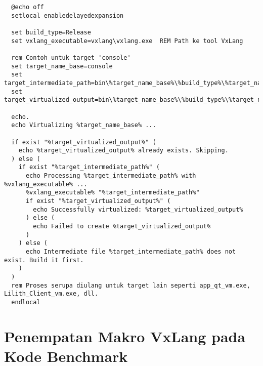\begin{verbatim}
  @echo off
  setlocal enabledelayedexpansion

  set build_type=Release
  set vxlang_executable=vxlang\vxlang.exe  REM Path ke tool VxLang

  rem Contoh untuk target 'console'
  set target_name_base=console
  set target_intermediate_path=bin\%target_name_base%\%build_type%\%target_name_base%_vm.exe
  set target_virtualized_output=bin\%target_name_base%\%build_type%\%target_name_base%_vm.vxm.exe

  echo.
  echo Virtualizing %target_name_base% ...

  if exist "%target_virtualized_output%" (
    echo %target_virtualized_output% already exists. Skipping.
  ) else (
    if exist "%target_intermediate_path%" (
      echo Processing %target_intermediate_path% with %vxlang_executable% ...
      %vxlang_executable% "%target_intermediate_path%"
      if exist "%target_virtualized_output%" (
        echo Successfully virtualized: %target_virtualized_output%
      ) else (
        echo Failed to create %target_virtualized_output%
      )
    ) else (
      echo Intermediate file %target_intermediate_path% does not exist. Build it first.
    )
  )
  rem Proses serupa diulang untuk target lain seperti app_qt_vm.exe, Lilith_Client_vm.exe, dll.
  endlocal
\end{verbatim}
\label{lst:virtualize_bat_appendix_full}

\chapter*{Penempatan Makro VxLang pada Kode Benchmark}
\label{app:benchmark_vxlang_macros_full} %

